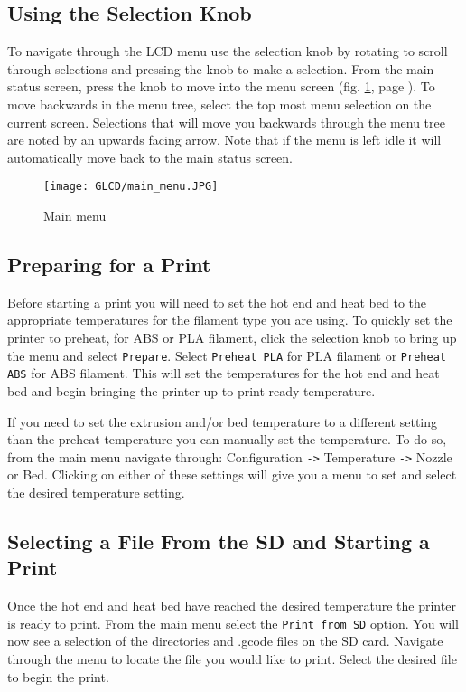 \subsection{Using the Selection Knob}
To navigate through the LCD menu use the selection knob by rotating to scroll through selections and pressing the knob to make a selection. From the main status screen, press the knob to move into the menu screen (fig. \ref{fig:main_menu}, page \pageref{fig:main_menu}). To move backwards in the menu tree, select the top most menu selection on the current screen. Selections that will move you backwards through the menu tree are noted by an upwards facing arrow. Note that if the menu is left idle it will automatically move back to the main status screen.

\begin{figure}[h]
\centering
\texttt{[image: GLCD/main\_menu.JPG]}
\caption{Main menu}
\label{fig:main_menu}
\end{figure}

\subsection{Preparing for a Print}
Before starting a print you will need to set the hot end and heat bed to the appropriate temperatures for the filament type you are using. To quickly set the printer to preheat, for ABS or PLA filament, click the selection knob to bring up the menu and select \texttt{Prepare}. Select \texttt{Preheat PLA} for PLA filament or \texttt{Preheat ABS} for ABS filament. This will set the temperatures for the hot end and heat bed and begin bringing the printer up to print-ready temperature.

If you need to set the extrusion and/or bed temperature to a different setting than the preheat temperature you can manually set the temperature. To do so, from the main menu navigate through: Configuration \texttt{->} Temperature \texttt{->} Nozzle or Bed. Clicking on either of these settings will give you a menu to set and select the desired temperature setting.

\subsection{Selecting a File From the SD and Starting a Print}
Once the hot end and heat bed have reached the desired temperature the printer is ready to print. From the main menu select the \texttt{Print from SD} option. You will now see a selection of the directories and .gcode files on the SD card. Navigate through the menu to locate the file you would like to print. Select the desired file to begin the print.

